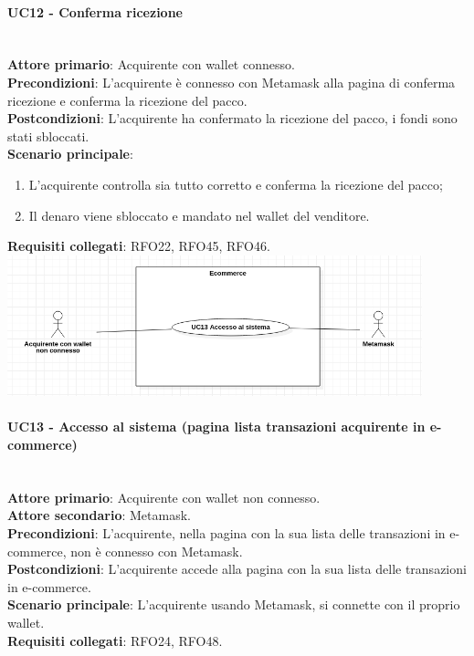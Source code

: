 \documentclass[a4paper, 12pt]{article}
\begin{document}
\paragraph{UC12 - Conferma ricezione}\\
\textbf{Attore primario}: Acquirente con wallet connesso.\\
\textbf{Precondizioni}: L'acquirente è connesso con Metamask alla pagina di conferma ricezione e conferma la ricezione del pacco.\\
\textbf{Postcondizioni}: L'acquirente ha confermato la ricezione del pacco, i fondi sono stati sbloccati.\\
\textbf{Scenario principale}:
\begin{enumerate}
    \item L'acquirente controlla sia tutto corretto e conferma la ricezione del pacco;
    \item Il denaro viene sbloccato e mandato nel wallet del venditore.
\end{enumerate}
\textbf{Requisiti collegati}: RFO22, RFO45, RFO46.\\

\includegraphics[width=0.9\textwidth]{UC_ECA1}

\paragraph{UC13 - Accesso al sistema (pagina lista transazioni acquirente in e-commerce)}\\
\textbf{Attore primario}: Acquirente con wallet non connesso.\\
\textbf{Attore secondario}: Metamask.\\
\textbf{Precondizioni}: L'acquirente, nella pagina con la sua lista delle transazioni in e-commerce, non è connesso con Metamask.\\
\textbf{Postcondizioni}: L'acquirente accede alla pagina con la sua lista delle transazioni in e-commerce.\\
\textbf{Scenario principale}:
L'acquirente usando Metamask, si connette con il proprio wallet.\\
\textbf{Requisiti collegati}: RFO24, RFO48.
\end{document}
